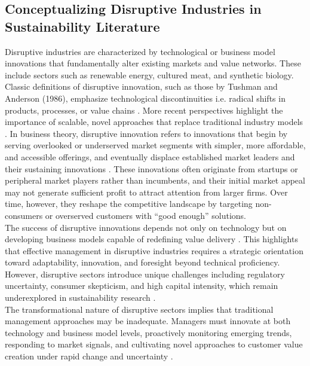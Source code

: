 	\subsection{Conceptualizing Disruptive Industries in Sustainability Literature}
	Disruptive industries are characterized by technological or business model innovations that fundamentally alter existing markets and value networks. These include sectors such as renewable energy, cultured meat, and synthetic biology. Classic definitions of disruptive innovation, such as those by Tushman and Anderson (1986), emphasize technological discontinuities i.e. radical shifts in products, processes, or value chains \cite{Tushman1986}. More recent perspectives highlight the importance of scalable, novel approaches that replace traditional industry models \cite{Yu2010}. In business theory, disruptive innovation refers to innovations that begin by serving overlooked or underserved market segments with simpler, more affordable, and accessible offerings, and eventually displace established market leaders and their sustaining innovations \cite{Christensen1997}. These innovations often originate from startups or peripheral market players rather than incumbents, and their initial market appeal may not generate sufficient profit to attract attention from larger firms. Over time, however, they reshape the competitive landscape by targeting non-consumers or overserved customers with “good enough” solutions. \\
	
	The success of disruptive innovations depends not only on technology but on developing business models capable of redefining value delivery \cite{Chesbrough2007}. This highlights that effective management in disruptive industries requires a strategic orientation toward adaptability, innovation, and foresight beyond technical proficiency. However, disruptive sectors introduce unique challenges including regulatory uncertainty, consumer skepticism, and high capital intensity, which remain underexplored in sustainability research \cite{Wustenhagen2007}. \\
	
	The transformational nature of disruptive sectors implies that traditional management approaches may be inadequate. Managers must innovate at both technology and business model levels, proactively monitoring emerging trends, responding to market signals, and cultivating novel approaches to customer value creation under rapid change and uncertainty \cite{Teece2007}.\\
	
